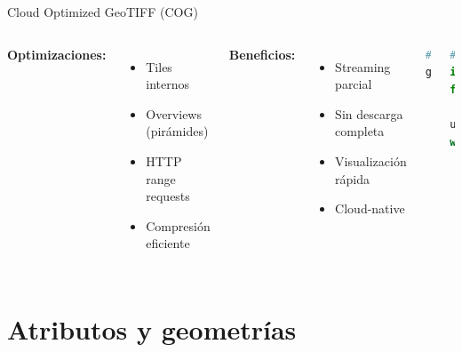 \documentclass[10pt,aspectratio=169]{beamer}
\begin{document}
\begin{frame}[fragile]{Cloud Optimized GeoTIFF (COG)}
    \begin{columns}[T]
        \footnotesize
        \textbf{Optimizaciones:}
        \begin{itemize}
            \item Tiles internos
            \item Overviews (pirámides)
            \item HTTP range requests
            \item Compresión eficiente
        \end{itemize}
        
        \textbf{Beneficios:}
        \begin{itemize}
            \item Streaming parcial
            \item Sin descarga completa
            \item Visualización rápida
            \item Cloud-native
        \end{itemize}
        
        \begin{lstlisting}[language=bash]
# Convertir a COG
gdal_translate input.tif output_cog.tif \
  -of COG \
  -co COMPRESS=LZW \
  -co BLOCKSIZE=512
        \end{lstlisting}
        
        \begin{lstlisting}[language=Python]
# Leer COG desde URL
import rasterio
from rasterio.windows import Window

url = 'https://example.com/cog.tif'
with rasterio.open(url) as src:
    # Leer solo una ventana
    window = Window(0, 0, 512, 512)
    data = src.read(1, window=window)
        \end{lstlisting}
    \end{columns}
\end{frame}

\section{Atributos y geometrías}
\end{document}
